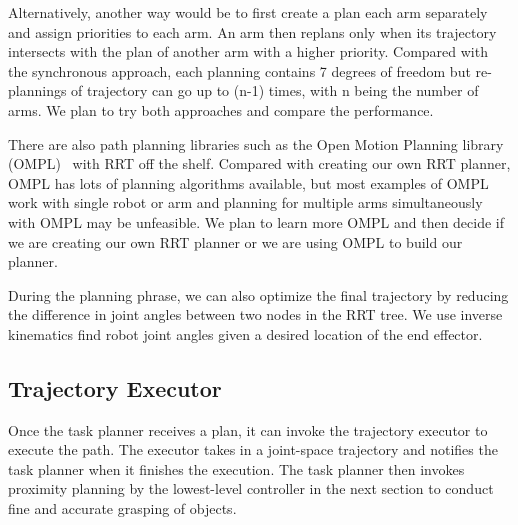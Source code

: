Alternatively, another way would be to first create a plan each arm separately and assign priorities to each arm. An arm then replans only when its trajectory intersects with the plan of another arm with a higher priority. Compared with the synchronous approach, each planning contains 7 degrees of freedom but re-plannings of trajectory can go up to (n-1) times, with n being the number of arms. We plan to try both approaches and compare the performance.

There are also path planning libraries such as the Open Motion Planning library (OMPL)~\cite{sucan2012the-open-motion-planning-library} with RRT off the shelf. Compared with  creating our own RRT planner, OMPL has lots of planning algorithms available, but most examples of OMPL work with single robot or arm and planning for multiple arms simultaneously with OMPL may be unfeasible. We plan to learn more OMPL and then decide if we are creating our own RRT planner or we are using OMPL to build our planner.

During the planning phrase, we can also optimize the final trajectory by reducing the difference in joint angles between two nodes in the RRT tree. We use inverse kinematics find robot joint angles given a desired location of the end effector.




\subsection{Trajectory Executor}

Once the task planner receives a plan, it can invoke the trajectory executor to execute the path. The executor takes in a joint-space trajectory and notifies the task planner when it finishes the execution. The task planner then invokes proximity planning by the lowest-level controller in the next section to conduct fine and accurate grasping of objects.
